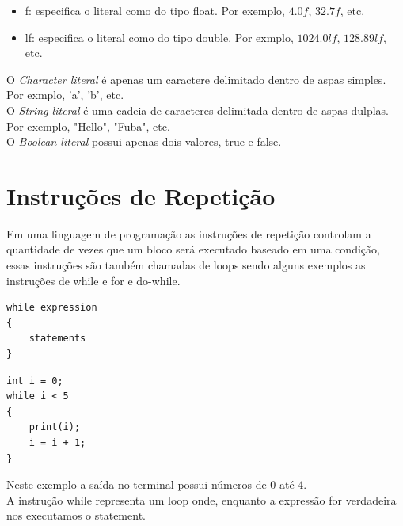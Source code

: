 \documentclass[12pt, letterpaper]{article}
\newcommand\tab[1][1cm]{\hspace*{#1}}
\newcommand\tabd[1][0.3cm]{\hspace*{#1}}
\begin{document}
\begin{itemize}
        \item f: especifica o literal como do tipo float. Por exemplo, $4.0f$, $32.7f$, etc.
        \item lf: especifica o literal como do tipo double. Por exmplo, $1024.0lf$, $128.89lf$, etc.
\end{itemize}

\begin{spacing}{1.5}
\end{spacing}

\tabd O \textit{Character literal} é apenas um caractere delimitado dentro de aspas simples. Por exmplo, 'a',
'b', etc.\\[1.0mm]
\tab O \textit{String literal} é uma cadeia de caracteres delimitada dentro de aspas dulplas. Por exemplo,
"Hello", "Fuba", etc.\\[1.0mm]
\tab O \textit{Boolean literal} possui apenas dois valores, true e false.

\section{Instruções de Repetição}
\tab Em uma linguagem de programação as instruções de repetição controlam 
a quantidade de vezes que um bloco será executado baseado em uma condição,
essas instruções são também chamadas de loops sendo alguns exemplos as
instruções de while e for e do-while.

\begin{spacing}{1.5}
\end{spacing}

\begin{lstlisting}[caption=Forma geral do while] 
while expression
{
    statements
}
\end{lstlisting}

\begin{lstlisting}[caption=Exemplo while]
int i = 0;
while i < 5
{
    print(i);
    i = i + 1;
}
\end{lstlisting}

\begin{spacing}{1.5}
\end{spacing}

\tab Neste exemplo a saída no terminal possui números de 0 até 4.\\[1.0mm]
\tab A instrução while representa um loop onde, enquanto a expressão for 
verdadeira nos executamos o statement.

\begin{spacing}{1.5}
\end{spacing}
\end{document}
